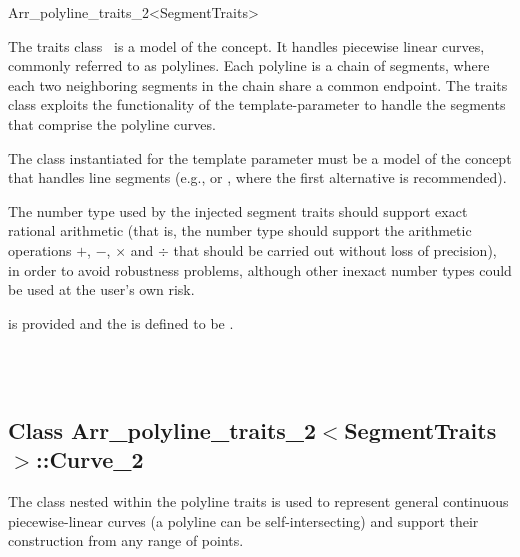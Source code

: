 
\ccRefPageBegin
\begin{ccRefClass}{Arr_polyline_traits_2<SegmentTraits>}

\ccDefinition

The traits class \ccRefName\ is a model of the 
concept. It handles piecewise linear curves, commonly referred to as
polylines. Each polyline is a chain of segments, where each two neighboring
segments in the chain share a common endpoint. The traits class exploits the
functionality of the  template-parameter to handle the
segments that comprise the polyline curves.

The class instantiated for the template parameter  must
be a model of the  concept that handles line
segments (e.g.,  or 
, where the first
alternative is recommended).

The number type used by the injected segment traits should support exact
rational arithmetic (that is, the number type should support
the arithmetic operations $+$, $-$, $\times$ and $\div$ that should be
carried out without loss of precision), in order to avoid robustness
problems, although other inexact number types could be used at the user's
own risk.

 is provided and the 
is defined to be .


\ccIsModel
  \\
  \\

\subsection*{Class Arr\_polyline\_traits\_2$<$SegmentTraits$>$::Curve\_2}

The  class nested within the polyline traits is used to
represent general continuous piecewise-linear curves (a polyline can be
self-intersecting) and support their construction from any range of points.


\end{ccRefClass}
